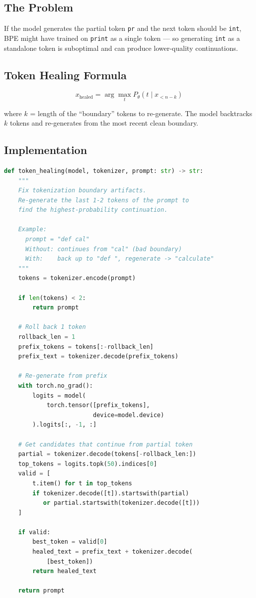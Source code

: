 \documentclass[11pt,a4paper]{article}
\begin{document}
\subsection{The Problem}

If the model generates the partial token \texttt{pr} and the next token should be \texttt{int}, BPE might have trained on \texttt{print} as a single token --- so generating \texttt{int} as a standalone token is suboptimal and can produce lower-quality continuations.

\subsection{Token Healing Formula}

$$x_{\text{healed}} = \arg\max_{t} P_\theta(t \mid x_{<n-k})$$

where $k$ = length of the ``boundary'' tokens to re-generate. The model backtracks $k$ tokens and re-generates from the most recent clean boundary.

\subsection{Implementation}

\begin{lstlisting}[language=Python, caption={Token Healing Implementation}]
def token_healing(model, tokenizer, prompt: str) -> str:
    """
    Fix tokenization boundary artifacts.
    Re-generate the last 1-2 tokens of the prompt to
    find the highest-probability continuation.
    
    Example:
      prompt = "def cal"
      Without: continues from "cal" (bad boundary)
      With:    back up to "def ", regenerate -> "calculate"
    """
    tokens = tokenizer.encode(prompt)
    
    if len(tokens) < 2:
        return prompt
    
    # Roll back 1 token
    rollback_len = 1
    prefix_tokens = tokens[:-rollback_len]
    prefix_text = tokenizer.decode(prefix_tokens)
    
    # Re-generate from prefix
    with torch.no_grad():
        logits = model(
            torch.tensor([prefix_tokens], 
                         device=model.device)
        ).logits[:, -1, :]
    
    # Get candidates that continue from partial token
    partial = tokenizer.decode(tokens[-rollback_len:])
    top_tokens = logits.topk(50).indices[0]
    valid = [
        t.item() for t in top_tokens
        if tokenizer.decode([t]).startswith(partial)
           or partial.startswith(tokenizer.decode([t]))
    ]
    
    if valid:
        best_token = valid[0]
        healed_text = prefix_text + tokenizer.decode(
            [best_token])
        return healed_text
    
    return prompt
\end{lstlisting}
\end{document}
